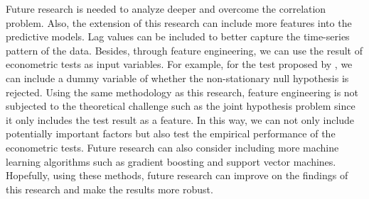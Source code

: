 \documentclass[12pt, man, a4paper, floatsintext]{apa7}
\begin{document}
Future research is needed to analyze deeper and overcome the correlation problem. Also, the extension of this research can include more features into the predictive models. Lag values can be included to better capture the time-series pattern of the data. Besides, through feature engineering, we can use the result of econometric tests as input variables. For example, for the test proposed by \textcite{craine1993}, we can include a dummy variable of whether the non-stationary null hypothesis is rejected. Using the same methodology as this research, feature engineering is not subjected to the theoretical challenge such as the joint hypothesis problem since it only includes the test result as a feature. In this way, we can not only include potentially important factors but also test the empirical performance of the econometric tests. Future research can also consider including more machine learning algorithms such as gradient boosting and support vector machines. Hopefully, using these methods, future research can improve on the findings of this research and make the results more robust.

    \clearpage
    \printbibliography
\end{document}
